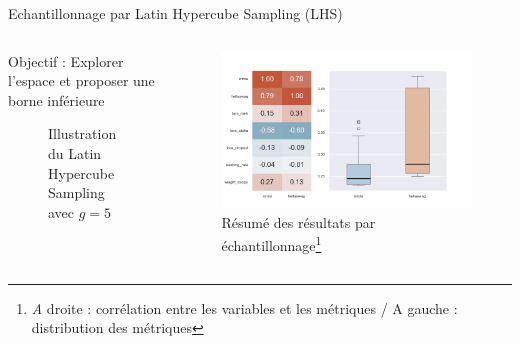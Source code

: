 \begin{frame}{Echantillonnage par Latin Hypercube Sampling (LHS)}
    \vspace*{-15pt}
    \begin{columns}
        \begin{column}[t]{0.35\textwidth} 
            \begin{block}{}
                Objectif : Explorer l'espace et proposer une borne inférieure
                
            \end{block}

            \begin{figure}
                \centering
                
                \caption{Illustration du Latin Hypercube Sampling avec $g=5$}
            \end{figure} 
     
            \end{column}
                 
            \begin{column}[t]{0.55\textwidth}
                \begin{figure}
                    \centering
                    \includegraphics[width = \textwidth]{assets/imgs/plots/sampling/lhs.png}
                    \vspace*{-20pt}\caption{Résumé des résultats par échantillonnage\footnote[5] { \textit A droite : corrélation entre les variables et les métriques / A gauche : distribution des métriques}}
                \end{figure} 
            \end{column}
                 
    \end{columns}
\end{frame}

